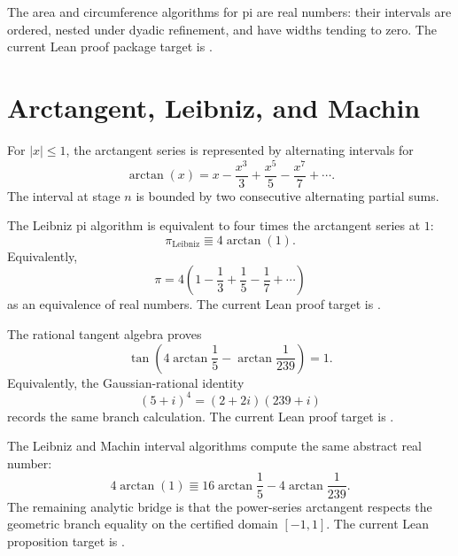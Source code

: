 \begin{conjecture}\label{conj:geometric-pi-validity}
The area and circumference algorithms for pi are real numbers: their intervals
are ordered, nested under dyadic refinement, and have widths tending to zero.
The current Lean proof package target is
.
\end{conjecture}

\section{Arctangent, Leibniz, and Machin}

\begin{definition}\label{def:arctan-series}
For \(|x|\le 1\), the arctangent series is represented by alternating
intervals for
\[
  \arctan(x)=
  x-\frac{x^3}{3}+\frac{x^5}{5}-\frac{x^7}{7}+\cdots .
\]
The interval at stage \(n\) is bounded by two consecutive alternating partial
sums.
\end{definition}

\begin{theorem}\label{thm:leibniz-arctan}
The Leibniz pi algorithm is equivalent to four times the arctangent series at
\(1\):
\[
  \pi_{\mathrm{Leibniz}}
  \Equiv
  4\arctan(1).
\]
Equivalently,
\[
  \pi
  =
  4\left(1-\frac13+\frac15-\frac17+\cdots\right)
\]
as an equivalence of real numbers.
The current Lean proof target is
.
\end{theorem}

\begin{theorem}\label{thm:machin-tangent}
The rational tangent algebra proves
\[
  \tan\!\left(4\arctan\frac15-\arctan\frac{1}{239}\right)=1.
\]
Equivalently, the Gaussian-rational identity
\[
  (5+i)^4=(2+2i)(239+i)
\]
records the same branch calculation.
The current Lean proof target is
.
\end{theorem}

\begin{conjecture}\label{conj:leibniz-machin}
The Leibniz and Machin interval algorithms compute the same abstract real
number:
\[
  4\arctan(1)
  \Equiv
  16\arctan\frac15-4\arctan\frac{1}{239}.
\]
The remaining analytic bridge is that the power-series arctangent respects
the geometric branch equality on the certified domain \([-1,1]\).
The current Lean proposition target is
.
\end{conjecture}

